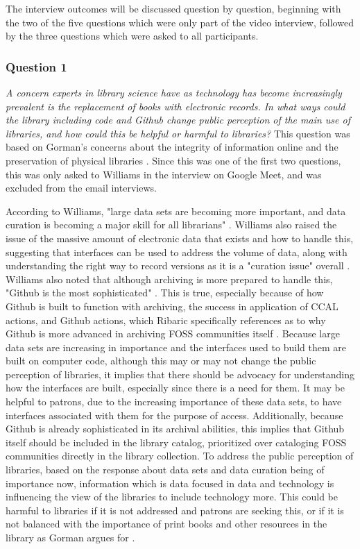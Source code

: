 The interview outcomes will be discussed question by question, beginning with the two of the five questions which were only part of the video interview, followed by the three questions which were asked to all participants. 

\subsubsection{Question 1}

\textit{A concern experts in library science have as technology has become increasingly prevalent is the replacement of books with electronic records. In what ways could the library including code and Github change public perception of the main use of libraries, and how could this be helpful or harmful to libraries?}
\hspace*{\fill}
This question was based on Gorman's concerns about the integrity of information online and the preservation of physical libraries \cite{gorman2000values}. Since this was one of the first two questions, this was only asked to Williams in the interview on Google Meet, and was excluded from the email interviews. 

According to Williams, "large data sets are becoming more important, and data curation is becoming a major skill for all librarians" \cite{patrickinterview}. Williams also raised the issue of the massive amount of electronic data that exists and how to handle this, suggesting that interfaces can be used to address the volume of data, along with understanding the right way to record versions as it is a "curation issue" overall \cite{patrickinterview}. Williams also noted that although archiving is more prepared to handle this, "Github is the most sophisticated" \cite{patrickinterview}. This is true, especially because of how Github is built to function with archiving, the success in application of CCAL actions, and Github actions, which Ribaric specifically references as to why Github is more advanced in archiving FOSS communities itself \cite{timinterview}. Because large data sets are increasing in importance and the interfaces used to build them are built on computer code, although this may or may not change the public perception of libraries, it implies that there should be advocacy for understanding how the interfaces are built, especially since there is a need for them. It may be helpful to patrons, due to the increasing importance of these data sets, to have interfaces associated with them for the purpose of access. Additionally, because Github is already sophisticated in its archival abilities, this implies that Github itself should be included in the library catalog, prioritized over cataloging FOSS communities directly in the library collection. To address the public perception of libraries, based on the response about data sets and data curation being of importance now, information which is data focused in data and technology is influencing the view of the libraries to include technology more. This could be harmful to libraries if it is not addressed and patrons are seeking this, or if it is not balanced with the importance of print books and other resources in the library as Gorman argues for \cite{gorman2000values}. 

